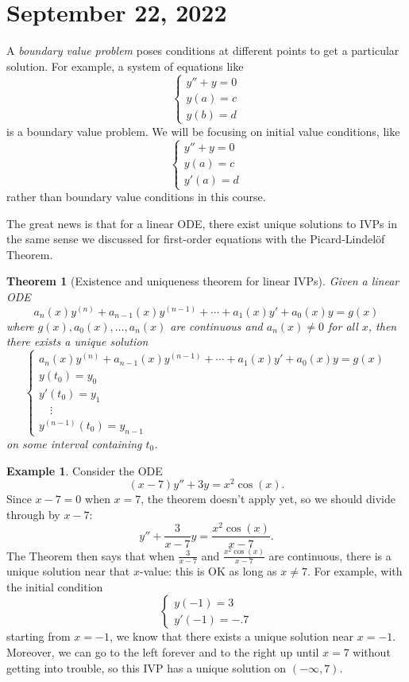 \documentclass[12pt]{amsart}
\numberwithin{equation}{section}
\theoremstyle{plain} %
\newtheorem{thm}[equation]{Theorem}
\newcommand{\Sept}[1]{\section{September #1, 2022}}
\theoremstyle{definition}
\newtheorem{ex}[equation]{Example}
\theoremstyle{remark}
\begin{document}
\newpage

\Sept{22}

A \emph{boundary value problem} poses conditions at different points to get a particular solution. For example, a system of equations like
\[\begin{cases} y'' + y = 0 \\ y(a) = c \\ y(b)=d\end{cases}\] is a boundary value problem.
We will be focusing on initial value conditions, like
\[\begin{cases} y'' + y = 0 \\ y(a) = c \\ y'(a)=d\end{cases}\] 
rather than boundary value conditions in this course.

The great news is that for a linear ODE, there exist unique solutions to IVPs in the same sense we discussed for first-order equations with the Picard-Lindel\"of Theorem.

\begin{thm}[Existence and uniqueness theorem for linear IVPs]
Given a linear ODE
\[ a_n(x) y^{(n)} + a_{n-1}(x) y^{(n-1)} + \cdots + a_1(x) y' + a_0(x) y = g(x)\]
where $g(x), a_0(x), \dots, a_n(x)$ are continuous and $a_n(x)\neq 0$ for all $x$, then there exists a unique solution
\[ \begin{cases} 
a_n(x) y^{(n)} + a_{n-1}(x) y^{(n-1)} + \cdots + a_1(x) y' + a_0(x) y = g(x) \\
y(t_0) = y_0\\
y'(t_0) = y_1 \\
 \quad  \vdots\\
y^{(n-1)}(t_0) = y_{n-1}
\end{cases}\]
on some interval containing $t_0$.
\end{thm}

\begin{ex} Consider the ODE
\[ (x-7) y'' + 3y = x^2 \cos(x).\]
Since $x-7=0$ when $x=7$, the theorem doesn't apply yet, so we should divide through by $x-7$:
\[ y'' + \frac{3}{x-7} y = \frac{x^2 \cos(x) }{x-7}.\]
The Theorem then says that when $\frac{3}{x-7}$ and $\frac{x^2 \cos(x) }{x-7}$ are continuous, there is a unique solution near that $x$-value: this is OK as long as $x\neq 7$.
For example, with the initial condition
\[ \begin{cases} y(-1) = 3 \\ y'(-1) = -.7\end{cases} \]
starting from $x=-1$, we know that there exists a unique solution near $x=-1$. Moreover, we can go to the left forever and to the right up until $x=7$ without getting into trouble, so this IVP has a unique solution on $(-\infty , 7)$.
\end{ex}
\end{document}
